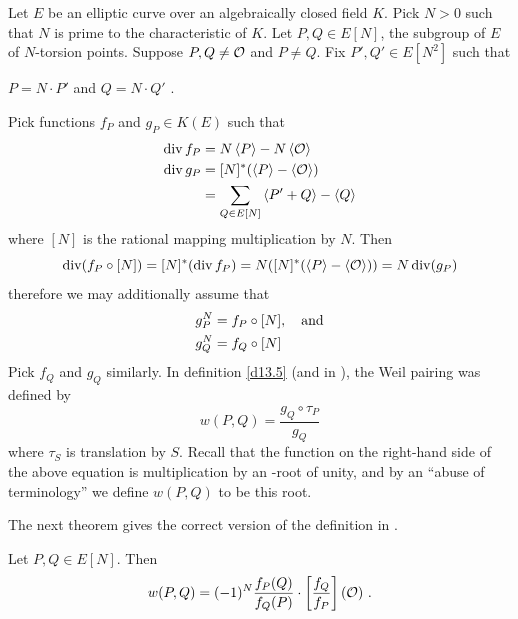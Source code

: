 Let $E$ be an elliptic curve over an algebraically closed field $K$. Pick $N>0$ such that $N$ is prime to the characteristic of $K$. Let $P,Q\in E[N]$, the subgroup of $E$ of $N$-torsion points. Suppose $P,Q\neq \mathcal{O}$ and $P\neq Q$. Fix $P',Q'\in E[N^{2}]$ such that
\begin{center}
$P=N\cdot P'$ and $Q=N\cdot Q'$ .
\end{center}

Pick functions $f_{P}$ and $g_{P}\in K(E)$ such that
\begin{align}
\label{eq2.28}
\operatorname{div}f_{P}&=N\left\langle P \right \rangle-N\left\langle \mathcal{O} \right \rangle\\
\operatorname{div}g_{P}&=[N]^{*}(\left\langle P \right \rangle-\left\langle \mathcal{O} \right \rangle) \notag\\
&= \sum_{Q\in E[N]} \left\langle P' + Q \right \rangle- \left\langle Q \right \rangle  \notag\\
\end{align}
where $[N]$ is the rational mapping multiplication by $N$. Then 
\[\operatorname{div} (f_P \circ[N]) = [N]^* (\operatorname{div} f_P) = N([N]^*(\left\langle P \right \rangle - \left\langle \mathcal{O} \right \rangle)) = N \operatorname{div}(g_P)\]
therefore we may additionally assume that
\begin{align}
\label{eq2.29}
g_{P}^{N}&=f_{P}\circ[N],\quad \text{and}\\
g_{Q}^{N}&=f_{Q}\circ[N]\notag
\end{align}
Pick $f_{Q}$ and $g_{Q}$ similarly. In definition \ref{d13.5} (and in \cite{r1.6}), the Weil pairing was defined by
$$
w(P,Q)=\frac{g_{Q}\circ\tau_{P}}{g_{Q}}
$$
where $\tau_{S}$ is translation by $S$. Recall that the function on the right-hand side of the above equation is multiplication by an -root of unity, and by an ``abuse of terminology'' we define $w(P, Q)$ to be this root.

The next theorem gives the correct version of the definition in \cite{r2.8}.

\begin{theo}
\label{t2.10.15}
Let $P,Q\in E[N]$. Then
$$
w(P,Q)=(-1)^{N}\frac{f_{P}(Q)}{f_{Q}(P)}\cdot \left[\frac{f_{Q}}{f_{P}}\right](\mathcal{O})\ .
$$
\end{theo}


